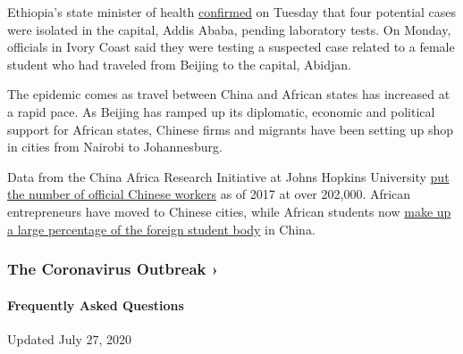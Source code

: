 Ethiopia's state minister of health
\href{https://twitter.com/lia_tadesse/status/1222146999371300865}{confirmed}
on Tuesday that four potential cases were isolated in the capital, Addis
Ababa, pending laboratory tests. On Monday, officials in Ivory Coast
said they were testing a suspected case related to a female student who
had traveled from Beijing to the capital, Abidjan.

The epidemic comes as travel between China and African states has
increased at a rapid pace. As Beijing has ramped up its diplomatic,
economic and political support for African states, Chinese firms and
migrants have been setting up shop in cities from Nairobi to
Johannesburg.

Data from the China Africa Research Initiative at Johns Hopkins
University
\href{http://www.sais-cari.org/data-chinese-workers-in-africa}{put the
number of official Chinese workers} as of 2017 at over 202,000. African
entrepreneurs have moved to Chinese cities, while African students now
\href{https://theconversation.com/china-tops-us-and-uk-as-destination-for-anglophone-african-students-78967}{make
up a large percentage of the foreign student body} in China.

\href{https://www.nytimes.com/news-event/coronavirus?action=click\&pgtype=Article\&state=default\&region=MAIN_CONTENT_3\&context=storylines_faq}{}

\hypertarget{the-coronavirus-outbreak-}{%
\subsubsection{The Coronavirus Outbreak
›}\label{the-coronavirus-outbreak-}}

\hypertarget{frequently-asked-questions}{%
\paragraph{Frequently Asked
Questions}\label{frequently-asked-questions}}

Updated July 27, 2020

